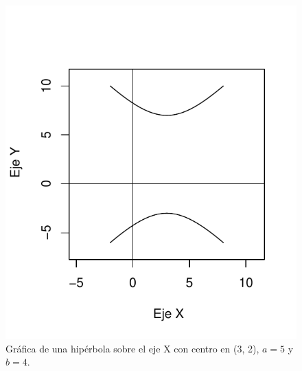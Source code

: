 \documentclass[12pt,a4paper]{report}
\begin{document}
\begin{figure}
\centering
\includegraphics[scale=0.9]{Hiperbola2}
\caption{Gráfica de una hipérbola sobre el eje X con centro en (3, 2), $a = 5$ y $b = 4$.}
\label{fig:Hiperbola2}
\end{figure}

\newpage



\end{document}
